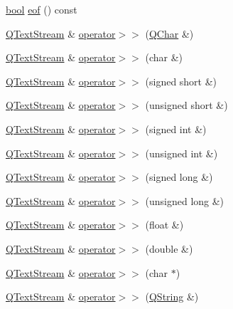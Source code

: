 \begin{DoxyCompactItemize}
\hyperlink{qglobal_8h_a1062901a7428fdd9c7f180f5e01ea056}{bool} \hyperlink{class_q_text_stream_a9cfc696427e99904d1c384d977118a2e}{eof} () const 
\item 
\hyperlink{class_q_text_stream}{Q\+Text\+Stream} \& \hyperlink{class_q_text_stream_a4d06cd74325e6420974f01156bdfc52a}{operator$>$$>$} (\hyperlink{class_q_char}{Q\+Char} \&)
\item 
\hyperlink{class_q_text_stream}{Q\+Text\+Stream} \& \hyperlink{class_q_text_stream_a71c417d8225d836e27b1854751f5ff5a}{operator$>$$>$} (char \&)
\item 
\hyperlink{class_q_text_stream}{Q\+Text\+Stream} \& \hyperlink{class_q_text_stream_a075cf521ee2f67e28c246cba2aa50102}{operator$>$$>$} (signed short \&)
\item 
\hyperlink{class_q_text_stream}{Q\+Text\+Stream} \& \hyperlink{class_q_text_stream_a5066c61f0e08736f3b99fffd02041a1f}{operator$>$$>$} (unsigned short \&)
\item 
\hyperlink{class_q_text_stream}{Q\+Text\+Stream} \& \hyperlink{class_q_text_stream_a220a232b218047c458f9e0a445b76831}{operator$>$$>$} (signed int \&)
\item 
\hyperlink{class_q_text_stream}{Q\+Text\+Stream} \& \hyperlink{class_q_text_stream_ae591ec4f654abd8450583b3a60a5015a}{operator$>$$>$} (unsigned int \&)
\item 
\hyperlink{class_q_text_stream}{Q\+Text\+Stream} \& \hyperlink{class_q_text_stream_aecfdad0a90cd7b4093b08a9d032d8563}{operator$>$$>$} (signed long \&)
\item 
\hyperlink{class_q_text_stream}{Q\+Text\+Stream} \& \hyperlink{class_q_text_stream_a68deb1875213bffc9334eb83c73210c2}{operator$>$$>$} (unsigned long \&)
\item 
\hyperlink{class_q_text_stream}{Q\+Text\+Stream} \& \hyperlink{class_q_text_stream_abd9ed695feef50e0dc72f0f366b5a4d8}{operator$>$$>$} (float \&)
\item 
\hyperlink{class_q_text_stream}{Q\+Text\+Stream} \& \hyperlink{class_q_text_stream_a7c671bbb530d2187da84d51141b540cd}{operator$>$$>$} (double \&)
\item 
\hyperlink{class_q_text_stream}{Q\+Text\+Stream} \& \hyperlink{class_q_text_stream_a52cffa4947a97d83d13aae06575820f4}{operator$>$$>$} (char $\ast$)
\item 
\hyperlink{class_q_text_stream}{Q\+Text\+Stream} \& \hyperlink{class_q_text_stream_a5f007c3a4d7d63a260048cf73ba19acc}{operator$>$$>$} (\hyperlink{class_q_string}{Q\+String} \&)
\item 

\end{DoxyCompactItemize}
